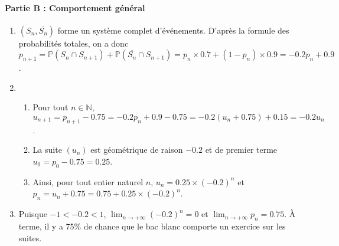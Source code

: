 \documentclass[11pt,fleqn, openany]{book} %
\begin{document}
\begin{solution}
\paragraph{Partie B : Comportement général}


  \begin{enumerate}  
    \item $(S_n,\overline{S_n})$ forme un système complet d'événements. D'après la formule des probabilités totales, on a donc $p_{n+1}=\mathbb{P}(S_n \cap S_{n+1})+\mathbb{P}(\overline{S_n}\cap S_{n+1})=p_n \times 0.7 + (1-p_n) \times 0.9=-0.2p_n+0.9$.
    \item 
    \begin{enumerate}
        \item Pour tout $n\in\mathbb{N}$, $u_{n+1}=p_{n+1}-0.75=-0.2p_n+0.9-0.75=-0.2(u_n+0.75)+0.15=-0.2u_n$.
        \item La suite $(u_n)$ est géométrique de raison $-0.2$ et de premier terme $u_0=p_0-0.75=0.25$.
        \item Ainsi, pour tout entier naturel $n$, $u_n=0.25 \times (-0.2)^n$ et $p_n=u_n+0.75=0.75+0.25\times(-0.2)^n$.
    \end{enumerate}
    \item Puisque $-1<-0.2<1$, $\displaystyle\lim_{n \to + \infty}(-0.2)^n=0$ et $\displaystyle\lim_{n \to + \infty}p_n=0.75$. À terme, il y a 75\% de chance que le bac blanc comporte un exercice sur les suites.
\end{enumerate}
\end{solution}
\end{document}
